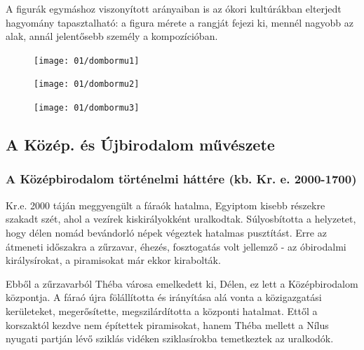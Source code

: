 A figurák egymáshoz viszonyított arányaiban is az ókori kultúrákban elterjedt hagyomány tapasztalható: a figura mérete a rangját fejezi ki, mennél nagyobb az alak, annál jelentősebb személy a kompozícióban.

\begin{figure}[H]
	\begin{tcolorbox}[enhanced,colframe=gray!50!white,
		colbacktitle=gray!15!white,
		coltitle=gray!50!black,
		borderline={0.5mm}{0mm}{gray!15!white},
		borderline={0.5mm}{0mm}{gray!50!white,dashed},
		attach boxed title to top center={yshift=-2mm},
		boxed title style={boxrule=0.4pt},
		title=Domborművek hivatalnokok masztabáiból]{
		\begin{minipage}{0.33\textwidth}
					\texttt{[image: 01/dombormu1]}
		\end{minipage}
		\hfill
		\begin{minipage}{0.25\textwidth}
					\texttt{[image: 01/dombormu2]}
		\end{minipage}	
		\hfill
		\begin{minipage}{0.36\textwidth}
			\texttt{[image: 01/dombormu3]}
		\end{minipage}}
	\end{tcolorbox}
\end{figure}

\cleardoublepage

\subsection*{A Közép. és Újbirodalom művészete}

\subsubsection*{A Középbirodalom történelmi háttére (kb. Kr. e. 2000-1700)}

Kr.e. 2000 táján meggyengült a fáraók hatalma, Egyiptom kisebb részekre szakadt szét, ahol a vezírek kiskirályokként uralkodtak. Súlyosbította a helyzetet, hogy délen nomád bevándorló népek végeztek hatalmas pusztítást. Erre az átmeneti időszakra a zűrzavar, éhezés, fosztogatás volt jellemző - az óbirodalmi királysírokat, a piramisokat már ekkor kirabolták.

Ebből a zűrzavarból Théba városa emelkedett ki, Délen, ez lett a Középbirodalom központja. A fáraó újra fölállította és irányítása alá vonta a közigazgatási kerületeket, megerősítette, megszilárdította a központi hatalmat. Ettől a korszaktól kezdve nem építettek piramisokat, hanem Théba mellett a Nílus nyugati partján lévő sziklás vidéken sziklasírokba temetkeztek az uralkodók.

